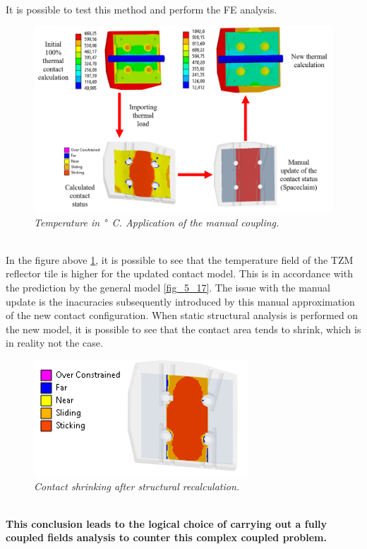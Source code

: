 \\
\normalsize{\indent It is possible to test this method and perform the \acrshort{FE} analysis.}
\\
\begin{figure}[!ht]
    \label{fig_5_18}
    \centering
    \includegraphics[width=1\textwidth]{figures/manualUpdate.png}
    \caption{\it Temperature in \unit{\si{\degree}C}. Application of the manual coupling.}
\end{figure}
\\
\normalsize{\indent In the figure above \ref{fig_5_18}, it is possible to see that the temperature field of the \acrshort{TZM} reflector tile is higher for the updated contact model. This is in accordance with the prediction by the general model \ref{fig_5_17}. The issue with the manual update is the inacuracies subsequently introduced by this manual approximation of the new contact configuration. When static structural analysis is performed on the new model, it is possible to see that the contact area tends to shrink, which is in reality not the case.}
\\
\begin{figure}[!ht]
    \label{fig_5_20}
    \centering
    \includegraphics[width=.5\textwidth]{figures/contactShrink.png}
    \caption{\it Contact shrinking after structural recalculation.}
\end{figure}
\\
\normalsize{\indent \bfseries This conclusion leads to the logical choice of carrying out a fully coupled fields analysis to counter this complex coupled problem.}
